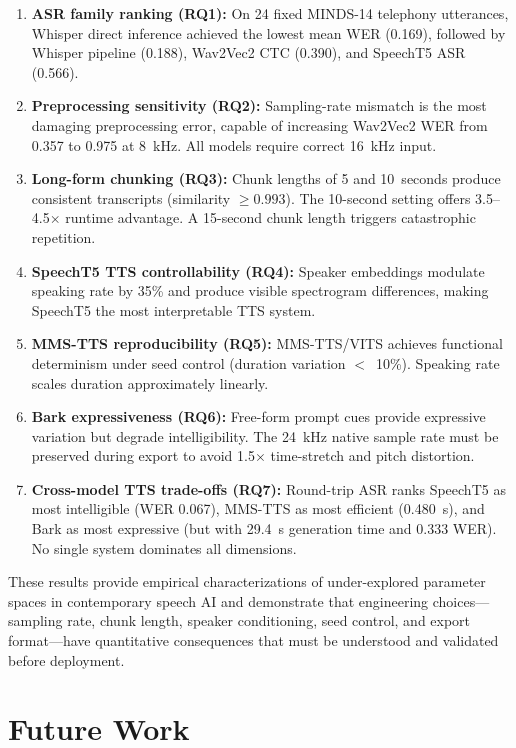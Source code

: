 \documentclass[conference]{IEEEtran}
\begin{document}
\begin{enumerate}
    \item \textbf{ASR family ranking (RQ1):} On 24 fixed MINDS-14 telephony utterances, Whisper direct inference achieved the lowest mean WER (0.169), followed by Whisper pipeline (0.188), Wav2Vec2 CTC (0.390), and SpeechT5 ASR (0.566).
    \item \textbf{Preprocessing sensitivity (RQ2):} Sampling-rate mismatch is the most damaging preprocessing error, capable of increasing Wav2Vec2 WER from 0.357 to 0.975 at 8~kHz. All models require correct 16~kHz input.
    \item \textbf{Long-form chunking (RQ3):} Chunk lengths of 5 and 10~seconds produce consistent transcripts (similarity $\geq 0.993$). The 10-second setting offers 3.5--4.5$\times$ runtime advantage. A 15-second chunk length triggers catastrophic repetition.
    \item \textbf{SpeechT5 TTS controllability (RQ4):} Speaker embeddings modulate speaking rate by 35\% and produce visible spectrogram differences, making SpeechT5 the most interpretable TTS system.
    \item \textbf{MMS-TTS reproducibility (RQ5):} MMS-TTS/VITS achieves functional determinism under seed control (duration variation $<$~10\%). Speaking rate scales duration approximately linearly.
    \item \textbf{Bark expressiveness (RQ6):} Free-form prompt cues provide expressive variation but degrade intelligibility. The 24~kHz native sample rate must be preserved during export to avoid 1.5$\times$ time-stretch and pitch distortion.
    \item \textbf{Cross-model TTS trade-offs (RQ7):} Round-trip ASR ranks SpeechT5 as most intelligible (WER 0.067), MMS-TTS as most efficient (0.480~s), and Bark as most expressive (but with 29.4~s generation time and 0.333 WER). No single system dominates all dimensions.
\end{enumerate}

These results provide empirical characterizations of under-explored parameter spaces in contemporary speech AI and demonstrate that engineering choices---sampling rate, chunk length, speaker conditioning, seed control, and export format---have quantitative consequences that must be understood and validated before deployment.

\section{Future Work}
\label{sec:futurework}
\end{document}
